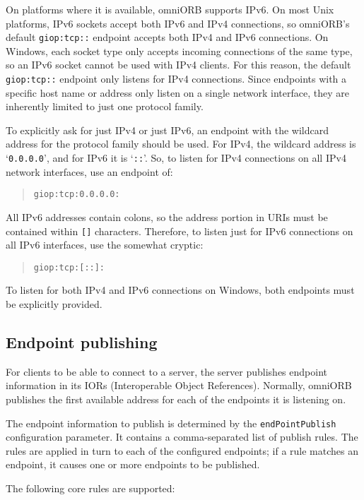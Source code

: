 \documentclass[11pt,twoside,a4paper]{book}
\newcommand{\code}[1]{\texttt{#1}}
\begin{document}
On platforms where it is available, omniORB supports IPv6. On most
Unix platforms, IPv6 sockets accept both IPv6 and IPv4 connections, so
omniORB's default \code{giop:tcp::} endpoint accepts both IPv4 and
IPv6 connections. On Windows, each socket type only accepts incoming
connections of the same type, so an IPv6 socket cannot be used with
IPv4 clients. For this reason, the default \code{giop:tcp::} endpoint
only listens for IPv4 connections. Since endpoints with a specific
host name or address only listen on a single network interface, they
are inherently limited to just one protocol family.

To explicitly ask for just IPv4 or just IPv6, an endpoint with the
wildcard address for the protocol family should be used. For IPv4, the
wildcard address is `\code{0.0.0.0}', and for IPv6 it is `\code{::}'.
So, to listen for IPv4 connections on all IPv4 network interfaces, use
an endpoint of:

\begin{quote}
\code{giop:tcp:0.0.0.0:}
\end{quote}

\noindent All IPv6 addresses contain colons, so the address portion in
URIs must be contained within \code{[]} characters. Therefore, to
listen just for IPv6 connections on all IPv6 interfaces, use the
somewhat cryptic:

\begin{quote}
\code{giop:tcp:[::]:}
\end{quote}

\noindent To listen for both IPv4 and IPv6 connections on Windows,
both endpoints must be explicitly provided.


\subsection{Endpoint publishing}

For clients to be able to connect to a server, the server publishes
endpoint information in its IORs (Interoperable Object References).
Normally, omniORB publishes the first available address for each of
the endpoints it is listening on.

The endpoint information to publish is determined by the
\code{endPointPublish} configuration parameter. It contains a
comma-separated list of publish rules. The rules are applied in turn
to each of the configured endpoints; if a rule matches an endpoint, it
causes one or more endpoints to be published.

The following core rules are supported:
\end{document}
